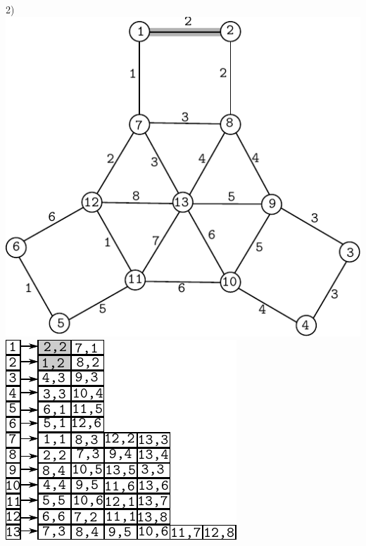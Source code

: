 \documentclass{article}
\begin{document}
\begin{center}
2)\includegraphics[scale=0.6]{bottleneck/g2}
\hspace{5mm}
\includegraphics[scale=0.9]{bottleneck/l2}
\end{center}
\end{document}
